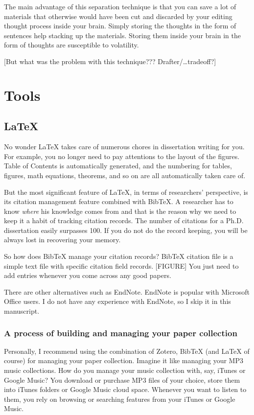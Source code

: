 \documentclass[11pt]{article}
\begin{document}
The main advantage of this separation technique is that you can save
a lot of materials that otherwise would have been cut and discarded
by your editing thought process inside your brain. Simply storing the
thoughts in the form of sentences help stacking up the materials.
Storing them inside your brain in the form of thoughts are susceptible
to volatility.

[But what was the problem with this technique??? Drafter/\ldots tradeoff?]

\section{Tools}

\subsection{LaTeX}

No wonder LaTeX takes care of numerous chores in dissertation writing
for you. For example, you no longer need to pay attentions to the layout of
the figures.  Table of Contents is automatically generated, and the
numbering for tables, figures, math equations, theorems, and so on are
all automatically taken care of. 

But the most significant feature of LaTeX, in terms of researchers'
perspective, is its citation management feature combined with BibTeX. A
researcher has to know \emph{where} his knowledge comes from and that is
the reason why we need to keep it a habit of tracking citation records.
The number of citations for a Ph.D. dissertation easily surpasses 100.
If you do not do the record keeping, you will be always lost in
recovering your memory.

So how does BibTeX manage your citation records? BibTeX citation file is a
simple text file with specific citation field records. [FIGURE] You just need
to add entries whenever you come across any good papers. 

There are other alternatives such as EndNote. EndNote is popular with
Microsoft Office users. I do not have any experience with EndNote, so I skip
it in this manuscript. 

\subsubsection{A process of building and managing your paper collection}
Personally, I recommend using the combination of Zotero, BibTeX (and
LaTeX of course) for managing your paper collection. Imagine it like
managing your MP3 music collections. How do you manage your music
collection with, say, iTunes or Google Music? You download or purchase
MP3 files of your choice, store them into iTunes folders or Google Music
cloud space. Whenever you want to listen to them, you rely on browsing or
searching features from your iTunes or Google Music.
\end{document}
